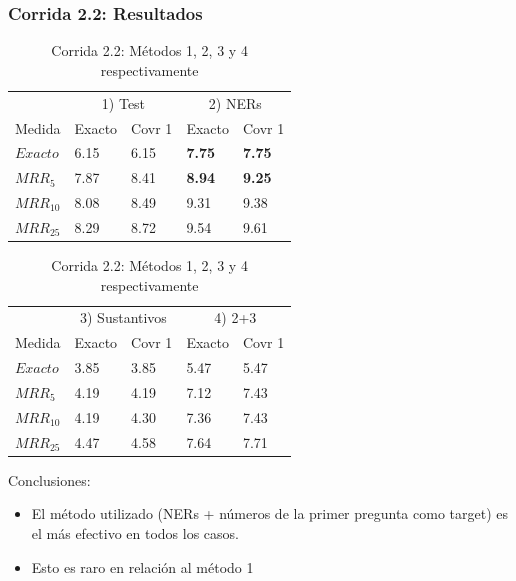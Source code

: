 \begin{frame}
\frametitle{Corrida 2.2: Resultados}

\begin{table}
\centering
\begin{center}
\begin{tabular}{|l | l | l | l | l |}

& \multicolumn{2}{|c|}{1) Test} & \multicolumn{2}{|c|}{2) NERs}  \\ 
Medida & Exacto & Covr 1 & Exacto & Covr 1 \\ 
$Exacto$ & 6.15 & 6.15 & \textbf{{\color{green}7.75}} & \textbf{{\color{green}7.75}} \\ 
$MRR_{5}$ & 7.87 & 8.41 & \textbf{{\color{green}8.94}} & \textbf{{\color{green}9.25}}  \\ 
$MRR_{10}$ & 8.08 & 8.49 & 9.31 & 9.38  \\ 
$MRR_{25}$ & 8.29 & 8.72 & 9.54 & 9.61  \\ 
\end{tabular}

\medskip

\begin{tabular}{|l | l | l | l | l |}

& \multicolumn{2}{|c|}{3) Sustantivos} & \multicolumn{2}{|c|}{4) 2+3} \\ 
Medida & Exacto & Covr 1 & Exacto & Covr 1 \\ 
$Exacto$ & 3.85 & 3.85 & 5.47 & 5.47 \\ 
$MRR_{5}$ & 4.19 & 4.19 & 7.12 & 7.43 \\ 
$MRR_{10}$ & 4.19 & 4.30 & 7.36 & 7.43 \\ 
$MRR_{25}$ & 4.47 & 4.58 & 7.64 & 7.71 \\ 
\end{tabular}
\caption{Corrida 2.2: Métodos 1, 2, 3 y 4 respectivamente}
\end{center}
\end{table}

Conclusiones:
\begin{itemize}
 \item El método utilizado (NERs + números de la primer pregunta como target) es el más efectivo en todos los casos.
 \item {\color{red}Esto es raro en relación al método 1}
\end{itemize}


\end{frame}


